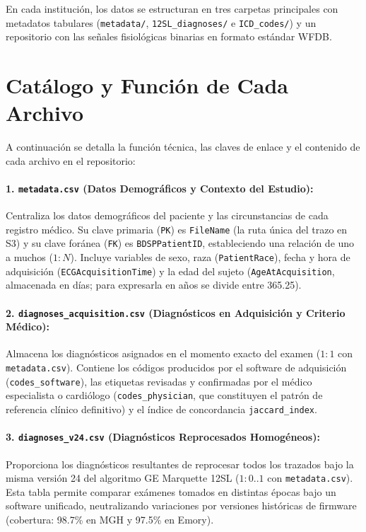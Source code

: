 \documentclass[11pt,a4paper]{article}
\begin{document}
En cada institución, los datos se estructuran en tres carpetas principales con metadatos tabulares (\texttt{metadata/}, \texttt{12SL\_diagnoses/} e \texttt{ICD\_codes/}) y un repositorio con las señales fisiológicas binarias en formato estándar WFDB.

\section{Catálogo y Función de Cada Archivo}

A continuación se detalla la función técnica, las claves de enlace y el contenido de cada archivo en el repositorio:

\paragraph{1. \texttt{metadata.csv} (Datos Demográficos y Contexto del Estudio):}
Centraliza los datos demográficos del paciente y las circunstancias de cada registro médico. Su clave primaria (\texttt{PK}) es \texttt{FileName} (la ruta única del trazo en S3) y su clave foránea (\texttt{FK}) es \texttt{BDSPPatientID}, estableciendo una relación de uno a muchos ($1:N$). Incluye variables de sexo, raza (\texttt{PatientRace}), fecha y hora de adquisición (\texttt{ECGAcquisitionTime}) y la edad del sujeto (\texttt{AgeAtAcquisition}, almacenada en días; para expresarla en años se divide entre 365.25).

\paragraph{2. \texttt{diagnoses\_acquisition.csv} (Diagnósticos en Adquisición y Criterio Médico):}
Almacena los diagnósticos asignados en el momento exacto del examen ($1:1$ con \texttt{metadata.csv}). Contiene los códigos producidos por el software de adquisición (\texttt{codes\_software}), las etiquetas revisadas y confirmadas por el médico especialista o cardiólogo (\texttt{codes\_physician}, que constituyen el patrón de referencia clínico definitivo) y el índice de concordancia \texttt{jaccard\_index}.

\paragraph{3. \texttt{diagnoses\_v24.csv} (Diagnósticos Reprocesados Homogéneos):}
Proporciona los diagnósticos resultantes de reprocesar todos los trazados bajo la misma versión 24 del algoritmo GE Marquette 12SL ($1:0..1$ con \texttt{metadata.csv}). Esta tabla permite comparar exámenes tomados en distintas épocas bajo un software unificado, neutralizando variaciones por versiones históricas de firmware (cobertura: 98.7\% en MGH y 97.5\% en Emory).
\end{document}
